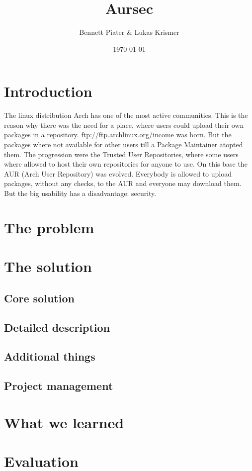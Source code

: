 \documentclass{scrartcl}
\title{Aursec}
\author{Bennett Piater \& Lukas Krismer}
\date{\today}
\begin{document}
  \thispagestyle{empty}

  
  
  \begin{abstract}
  \end{abstract}

  \tableofcontents
  \listoffigures
  \listoftables
  \pagebreak


  \section{Introduction}
  The linux distribution Arch has one of the most active communities. This is the reason why there was the need for a place, where users could upload their own packages in a repository. ftp://ftp.archlinux.org/income was born. But the packages where not available for other users till a Package Maintainer atopted them. The progression were the Trusted User Repositories, where some users where allowed to host their own repositories for anyone to use. On this base the AUR (Arch User Repository) was evolved. Everybody is allowed to upload packages, without any checks, to the AUR and everyone may download them. But the big usability has a disadvantage: security.  \cite{wiki:AUR}

  \section{The problem}

  \section{The solution}
    \subsection{Core solution}
    \subsection{Detailed description}
    \subsection{Additional things}
    \subsection{Project management}

  \section{What we learned}

  \section{Evaluation}

  \pagebreak
  
  
\end{document}
